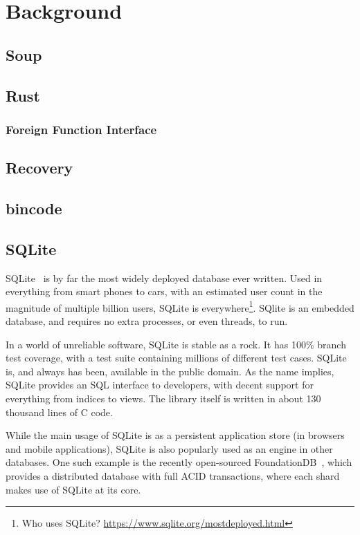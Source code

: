 \chapter{Background}\label{chap:background}

\section{Soup}

\section{Rust}
\subsection{Foreign Function Interface}

\section{Recovery}

\section{bincode}

\section{SQLite}\label{sec:sqlite}
SQLite~\cite{sqlite} is by far the most widely deployed database ever written.
Used in everything from smart phones to cars, with an estimated user count in
the magnitude of multiple billion users, SQLite is everywhere\footnote{Who
uses SQLite? \url{https://www.sqlite.org/mostdeployed.html}}. SQlite is an
embedded database, and requires no extra processes, or even threads, to run.

In a world of unreliable software, SQLite is stable as a rock. It has 100\%
branch test coverage, with a test suite containing millions of different test
cases. SQLite is, and always has been, available in the public domain. As the
name implies, SQLite provides an SQL interface to developers, with decent support
for everything from indices to views. The library itself is written in about 130
thousand lines of C code.

While the main usage of SQLite is as a persistent application store (\eg in
browsers and mobile applications), SQLite is also popularly used as an engine in
other databases. One such example is the recently open-sourced
FoundationDB~\cite{foundation}, which provides a distributed database with full
ACID transactions, where each shard makes use of SQLite at its core.

